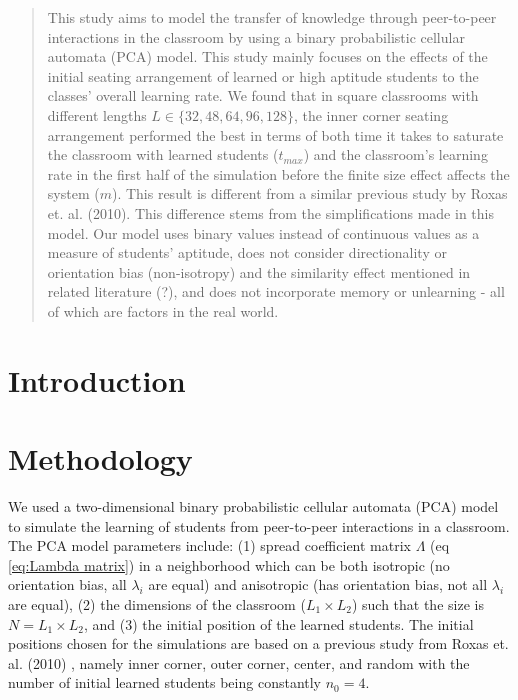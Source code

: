 \documentclass[10pt,a4paper,twoside]{article}
\begin{document}
\begin{abstract}
\noindent
This study aims to model the transfer of knowledge through peer-to-peer interactions in the classroom by using a binary probabilistic cellular automata (PCA) model. This study mainly focuses on the effects of the  initial seating arrangement of learned or high aptitude students to the classes' overall learning rate. We found that in square classrooms with different lengths $L \in\lbrace32,48,64,96,128\rbrace$, the inner corner seating arrangement performed the best in terms of both time it takes to saturate the classroom with learned students ($t_{max}$) and the classroom’s learning rate in the first half of the simulation before the finite size effect affects the system ($m$). This result is different from a similar previous study by Roxas et. al. (2010). This difference stems from the simplifications made in this model. Our model uses binary values instead of continuous values as a measure of students’ aptitude, does not consider directionality or orientation bias (non-isotropy) and the similarity effect mentioned in related literature (?), and does not incorporate memory or unlearning - all of which are factors in the real world.


\end{abstract}

\maketitle
\thispagestyle{titlestyle}


\section{Introduction}\label{sec:intro}


\section{Methodology}\label{sec:methods}
We used a two-dimensional binary probabilistic cellular automata (PCA) model to simulate the learning of students from peer-to-peer interactions in a classroom. The PCA model parameters include: (1) spread coefficient matrix $\Lambda$ (eq \ref{eq:Lambda matrix}) in a neighborhood which can be both isotropic (no orientation bias, all $\lambda_i$ are equal) and anisotropic (has orientation bias, not all $\lambda_i$ are equal), (2) the dimensions of the classroom ($L_1 \times L_2$) such that the size is $N=L_1 \times L_2$, and (3) the initial position of the learned students. The initial positions chosen for the simulations are based on a previous study from Roxas et. al. (2010) \cite{roxas2010seating}, namely inner corner, outer corner, center, and random with the number of initial learned students being constantly $n_0 = 4$. 
\end{document}
